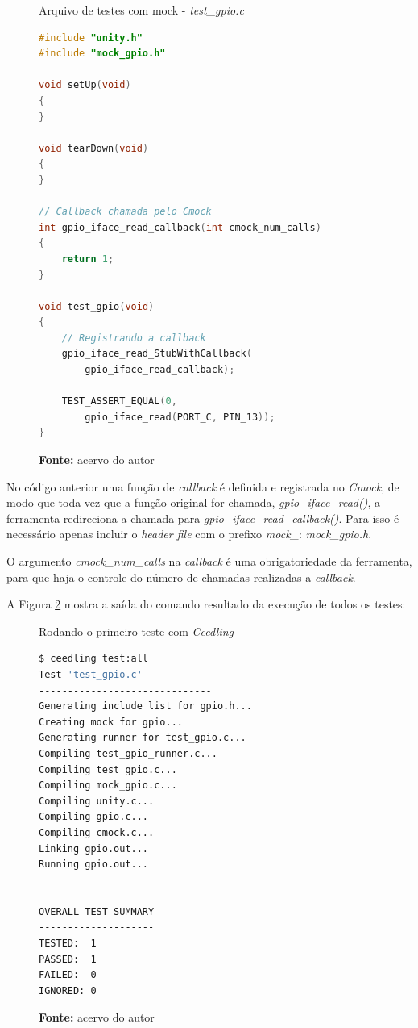 \documentclass[times, twoside, watermark]{artigo}
\begin{document}
\begin{figure}[H]
  \centering
  \caption{Arquivo de testes com mock - \textit{test\_gpio.c}}
\begin{lstlisting}[language=C]
#include "unity.h"
#include "mock_gpio.h"

void setUp(void)
{
}

void tearDown(void)
{
}

// Callback chamada pelo Cmock
int gpio_iface_read_callback(int cmock_num_calls)
{
    return 1;
}

void test_gpio(void)
{
    // Registrando a callback
    gpio_iface_read_StubWithCallback(
        gpio_iface_read_callback);
        
    TEST_ASSERT_EQUAL(0, 
        gpio_iface_read(PORT_C, PIN_13));
}
\end{lstlisting}
  \label{fig:mock-test}
  \caption*{\newline\textbf{Fonte:} acervo do autor}
\end{figure}

No código anterior uma função de \textit{callback} é definida e registrada no
\textit{Cmock}, de modo que toda vez que a função original for chamada,
\textit{gpio\_iface\_read()}, a ferramenta redireciona a chamada para
\textit{gpio\_iface\_read\_callback()}. Para isso é necessário apenas incluir
o \textit{header file} com o prefixo \textit{mock\_}: \textit{mock\_gpio.h}.

O argumento \textit{cmock\_num\_calls} na \textit{callback} é uma obrigatoriedade
da ferramenta, para que haja o controle do número de chamadas realizadas a
\textit{callback}.

A Figura \ref{fig:ceedling-output} mostra a saída do comando resultado da execução
de todos os testes:\hfill\\

\begin{figure}[H]
  \centering
  \caption{Rodando o primeiro teste com \textit{Ceedling}}
\begin{lstlisting}[language=bash]
$ ceedling test:all
Test 'test_gpio.c'
------------------------------
Generating include list for gpio.h...
Creating mock for gpio...
Generating runner for test_gpio.c...
Compiling test_gpio_runner.c...
Compiling test_gpio.c...
Compiling mock_gpio.c...
Compiling unity.c...
Compiling gpio.c...
Compiling cmock.c...
Linking gpio.out...
Running gpio.out...

--------------------
OVERALL TEST SUMMARY
--------------------
TESTED:  1
PASSED:  1
FAILED:  0
IGNORED: 0
\end{lstlisting}
  \label{fig:ceedling-output}
  \caption*{\newline\textbf{Fonte:} acervo do autor}
\end{figure}
\end{document}
